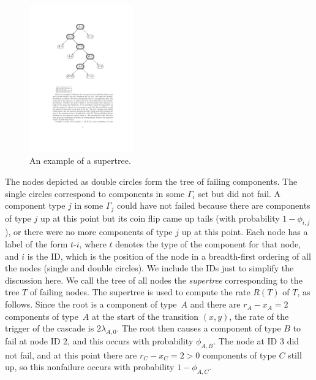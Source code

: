 \documentclass[12pt]{article}
\begin{document}
\begin{figure}
\begin{center}
\includegraphics[width=0.4\textwidth]{fig_tree}
\end{center}
\caption{An example of a supertree.}
\label{fig:tree}
\end{figure}


The nodes depicted as double circles
form the tree of failing components.
The single circles correspond to
components in some $\Gamma_i$ set
but did not fail.  A component type
$j$ in some $\Gamma_j$ could have
not failed because there are
components of type $j$ up at this
point but its coin flip
came up tails 
(with probability $1 - \phi_{i,j}$),
or there were no more components of
type $j$ up at this point.
Each node has a label of the form
$t$-$i$, where $t$ denotes the
type of the component for that node,
and $i$ is the ID, which
is the position of the node
in a breadth-first ordering of
all the nodes (single and double circles).
We include the IDs just to simplify
the discussion here.
We call the tree of all nodes
the \textit{supertree} corresponding
to the tree $T$ of failing nodes.
The supertree is used to compute
the rate $R(T)$ of $T$, as follows.
Since the root is a component of
type~$A$ and there are
$r_A - x_A = 2$ components of type~$A$
at the start of the transition $(x,y)$,
the rate of the trigger of the cascade
is $2 \lambda_{A,0}$.
The root then causes a component
of type $B$ to fail at node ID $2$,
and this occurs with probability
$\phi_{A,B}$.
The node at ID $3$ did not fail,
and at this point there are
$r_C - x_C = 2 > 0$ components of type $C$
still up, so this nonfailure occurs
with probability $1 - \phi_{A,C}$.




\end{document}
